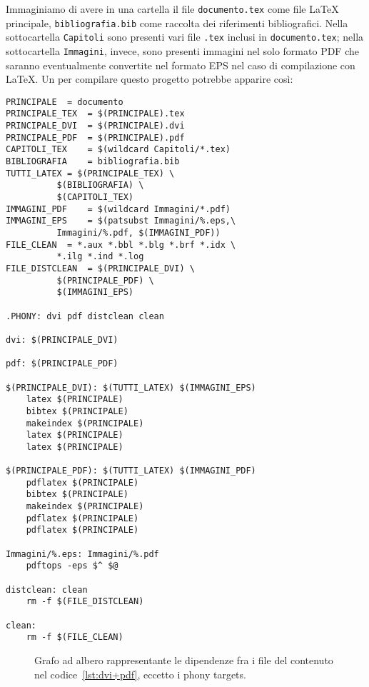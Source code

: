 Immaginiamo di avere in una cartella il file \texttt{documento.tex} come file
\LaTeX{}
principale, \texttt{bibliografia.bib} come raccolta dei riferimenti
bibliografici.  Nella sottocartella \texttt{Capitoli} sono presenti vari file
\texttt{.tex} inclusi in \texttt{documento.tex}; nella sottocartella
\texttt{Immagini}, invece, sono presenti immagini nel solo formato \textsc{PDF}
che saranno eventualmente convertite nel formato \textsc{EPS} nel caso di
compilazione con \LaTeX.  Un  per compilare questo progetto
potrebbe apparire così:
\begin{lstlisting}[caption={\filestyle{Makefile} in cui la prima regola compila
il documento in \textsc{DVI} convertendo le immagini \textsc{PDF} in
\textsc{EPS}, la seconda regola compila in formato \textsc{PDF}.},
label=lst:dvi+pdf]
PRINCIPALE 	= documento
PRINCIPALE_TEX	= $(PRINCIPALE).tex
PRINCIPALE_DVI	= $(PRINCIPALE).dvi
PRINCIPALE_PDF	= $(PRINCIPALE).pdf
CAPITOLI_TEX	= $(wildcard Capitoli/*.tex)
BIBLIOGRAFIA	= bibliografia.bib
TUTTI_LATEX	= $(PRINCIPALE_TEX) \
		  $(BIBLIOGRAFIA) \
		  $(CAPITOLI_TEX)
IMMAGINI_PDF	= $(wildcard Immagini/*.pdf)
IMMAGINI_EPS	= $(patsubst Immagini/%.eps,\
		  Immagini/%.pdf, $(IMMAGINI_PDF))
FILE_CLEAN	= *.aux *.bbl *.blg *.brf *.idx \
		  *.ilg *.ind *.log
FILE_DISTCLEAN	= $(PRINCIPALE_DVI) \
		  $(PRINCIPALE_PDF) \
		  $(IMMAGINI_EPS)

.PHONY: dvi pdf distclean clean

dvi: $(PRINCIPALE_DVI)

pdf: $(PRINCIPALE_PDF)

$(PRINCIPALE_DVI): $(TUTTI_LATEX) $(IMMAGINI_EPS)
	latex $(PRINCIPALE)
	bibtex $(PRINCIPALE)
	makeindex $(PRINCIPALE)
	latex $(PRINCIPALE)
	latex $(PRINCIPALE)

$(PRINCIPALE_PDF): $(TUTTI_LATEX) $(IMMAGINI_PDF)
	pdflatex $(PRINCIPALE)
	bibtex $(PRINCIPALE)
	makeindex $(PRINCIPALE)
	pdflatex $(PRINCIPALE)
	pdflatex $(PRINCIPALE)

Immagini/%.eps: Immagini/%.pdf
	pdftops -eps $^ $@

distclean: clean
	rm -f $(FILE_DISTCLEAN)

clean:
	rm -f $(FILE_CLEAN)
\end{lstlisting}
\begin{figure}
  \centering
  \caption{Grafo ad albero rappresentante le dipendenze fra i file del
    \filestyle{Makefile} contenuto nel codice~\ref{lst:dvi+pdf}, eccetto i phony
    targets.}
  \label{fig:grafo-albero2}
\end{figure}
